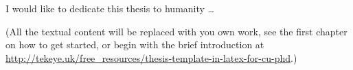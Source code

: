 
\begin{dedication} 

I would like to dedicate this thesis to humanity \dots

(All the textual content will be replaced with you own work, see the first chapter on how to get started, or begin with the brief introduction at \url{http://tekeye.uk/free_resources/thesis-template-in-latex-for-cu-phd}.)

\end{dedication}

